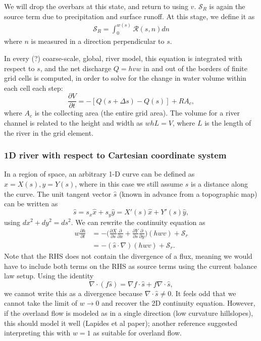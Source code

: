 \documentclass[twoside,10pt]{report}
\begin{document}
We will drop the overbars at this state, and return to using $v$.  $\mathcal{S}_R$ is again the source term due to precipitation and surface runoff. At this stage, we define it as
\begin{align}
    \mathcal{S}_R = \int_0^{w(s)} \mathcal{R}(s,n) dn
\end{align}
where $n$ is measured in a direction perpendicular to $s$.


In every (?) coarse-scale, global, river model, this equation is integrated with respect to $s$, and the net discharge $Q = hv w$ in and out of the borders of finite grid cells is computed, in order to solve for the change in water volume within each cell each step:
\begin{equation}
    \frac{\partial V}{\partial t} = -[Q(s+\Delta s) - Q(s)]   +  R A_c,
\end{equation}
where $A_c$ is the collecting area (the entire grid area). The volume for a river channel is related to the height and width as $w h L = V$, where $L$ is the length of the river in the grid element.

\subsubsection{1D river with respect to Cartesian coordinate system}
In a region of space, an arbitrary 1-D curve can be defined as $x = X(s), y = Y(s)$, where in this case we still assume $s$ is a distance along the curve. The unit tangent vector $\hat{s}$ (known in advance from a topographic map) can be written as
\begin{equation}
    \hat{s} = s_x \hat{x} + s_y\hat{y} = X'(s)\hat{x} + Y'(s) \hat{y},
\end{equation}
using $dx^2+dy^2 = ds^2$. We can rewrite the continuity equation as
\begin{align}\label{continuity_cartesian}
    w\frac{\partial h}{\partial t} &= -\bigg(\frac{\partial X}{\partial s} \frac{\partial }{\partial x} +\frac{\partial Y}{\partial s} \frac{\partial }{\partial y}\bigg) (hwv) +  \mathcal{S}_r \nonumber \\
    & = -(\hat{s} \cdot \nabla) (hwv) + \mathcal{S}_r.
\end{align}
Note that the RHS does not contain the divergence of a flux, meaning we would have to include both terms on the RHS as source terms using the current balance law setup. Using the identity
\begin{equation}
    \nabla \cdot (f \hat{s}) = \nabla f \cdot \hat{s} +f \nabla \cdot \hat{s},
\end{equation}
we cannot write this as a divergence because $\nabla \cdot \hat{s} \ne 0$. It feels odd that we cannot take the limit of $w \rightarrow 0$ and recover the 2D continuity equation. However, if the overland flow is modeled as in a single direction (low curvature hillslopes), this should model it well (Lapides et al paper); another reference suggested interpreting this with $w=1$ as suitable for overland flow.
\end{document}
